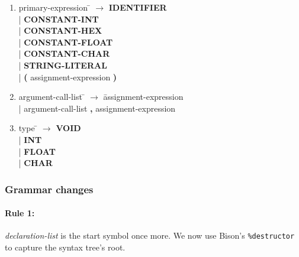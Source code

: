 \begin{enumerate}
\item \begin{tabbing} primary-expression \= $\rightarrow$ \= \textbf{IDENTIFIER} \\
	\> \hspace*{0.05cm} | \> \textbf{CONSTANT-INT} \\
	\> \hspace*{0.05cm} | \> \textbf{CONSTANT-HEX} \\
	\> \hspace*{0.05cm} | \> \textbf{CONSTANT-FLOAT} \\
	\> \hspace*{0.05cm} | \> \textbf{CONSTANT-CHAR} \\
	\> \hspace*{0.05cm} | \> \textbf{STRING-LITERAL} \\
	\> \hspace*{0.05cm} | \> \textbf{(} assignment-expression \textbf{)} \\
\end{tabbing}

\item \begin{tabbing} argument-call-list \= $\rightarrow$ \= assignment-expression \\
	\> \hspace*{0.05cm} | \> argument-call-list \textbf{,} assignment-expression
\end{tabbing}

\item \begin{tabbing} type \= $\rightarrow$ \= \textbf{VOID} \\
	\> \hspace*{0.05cm} | \> \textbf{INT} \\
	\> \hspace*{0.05cm} | \> \textbf{FLOAT} \\
	\> \hspace*{0.05cm} | \> \textbf{CHAR}
\end{tabbing}

\end{enumerate}
\normalsize

\subsubsection{Grammar changes}
\paragraph{Rule 1:} \textit{declaration-list} is the start symbol once more. We now use Bison's \texttt{\%destructor}
to capture the syntax tree's root.

